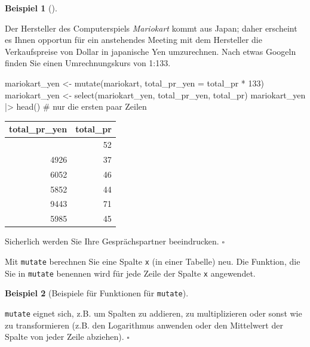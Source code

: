 \documentclass[
  letterpaper,
  twoside,
  open=any]{scrbook}
\newenvironment{Shaded}{\begin{snugshade}}{\end{snugshade}}
\newcommand{\AttributeTok}[1]{\textcolor[rgb]{0.40,0.45,0.13}{#1}}
\newcommand{\CommentTok}[1]{\textcolor[rgb]{0.37,0.37,0.37}{#1}}
\newcommand{\DecValTok}[1]{\textcolor[rgb]{0.68,0.00,0.00}{#1}}
\newcommand{\FunctionTok}[1]{\textcolor[rgb]{0.28,0.35,0.67}{#1}}
\newcommand{\NormalTok}[1]{\textcolor[rgb]{0.00,0.23,0.31}{#1}}
\newcommand{\OtherTok}[1]{\textcolor[rgb]{0.00,0.23,0.31}{#1}}
\newcommand{\SpecialCharTok}[1]{\textcolor[rgb]{0.37,0.37,0.37}{#1}}
\theoremstyle{definition}
\theoremstyle{definition}
\newtheorem{example}{Beispiel}[chapter]
\theoremstyle{definition}
\theoremstyle{remark}
\begin{document}
\begin{example}[]\protect\hypertarget{exm-mutate}{}\label{exm-mutate}

Der Hersteller des Computerspiels \emph{Mariokart} kommt aus Japan;
daher erscheint es Ihnen opportun für ein anstehendes Meeting mit dem
Hersteller die Verkaufspreise von Dollar in japanische Yen umzurechnen.
Nach etwas Googeln finden Sie einen Umrechnungskurs von 1:133.

\begin{Shaded}
\begin{Highlighting}[]
\NormalTok{mariokart\_yen }\OtherTok{\textless{}{-}} 
  \FunctionTok{mutate}\NormalTok{(mariokart, }\AttributeTok{total\_pr\_yen =}\NormalTok{ total\_pr }\SpecialCharTok{*} \DecValTok{133}\NormalTok{)}
\NormalTok{mariokart\_yen }\OtherTok{\textless{}{-}} \FunctionTok{select}\NormalTok{(mariokart\_yen, total\_pr\_yen, total\_pr)}
\NormalTok{mariokart\_yen }\SpecialCharTok{|\textgreater{}} \FunctionTok{head}\NormalTok{()  }\CommentTok{\# nur die ersten paar Zeilen}
\end{Highlighting}
\end{Shaded}

\begin{longtable}[]{@{}rr@{}}
\toprule\noalign{}
total\_pr\_yen & total\_pr \\
\midrule\noalign{}
\endhead
\bottomrule\noalign{}
\endlastfoot
6856 & 52 \\
4926 & 37 \\
6052 & 46 \\
5852 & 44 \\
9443 & 71 \\
5985 & 45 \\
\end{longtable}

Sicherlich werden Sie Ihre Gesprächspartner beeindrucken. \(\square\)

\end{example}

Mit \texttt{mutate} berechnen Sie eine Spalte \texttt{x} (in einer
Tabelle) neu. Die Funktion, die Sie in \texttt{mutate} benennen wird für
jede Zeile der Spalte \texttt{x} angewendet.

\begin{example}[Beispiele für Funktionen für
\texttt{mutate}]\protect\hypertarget{exm-mutate2}{}\label{exm-mutate2}

\texttt{mutate} eignet sich, z.B. um Spalten zu addieren, zu
multiplizieren oder sonst wie zu transformieren (z.B. den Logarithmus
anwenden oder den Mittelwert der Spalte von jeder Zeile abziehen).
\(\square\)

\end{example}
\end{document}
